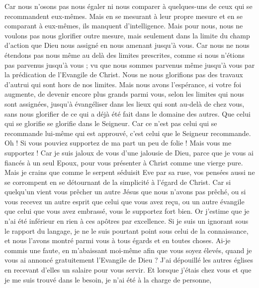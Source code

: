 \begin{multicols}{2}
Car nous n'osons pas nous égaler ni nous comparer à quelques-uns de ceux qui se recommandent eux-mêmes. Mais en se mesurant à leur propre mesure et en se comparant à eux-mêmes, ils manquent d’intelligence.
Mais pour nous, nous ne voulons pas nous glorifier outre mesure, mais seulement dans la limite du champ d’action que Dieu nous assigné en nous amenant jusqu’à vous.
Car nous ne nous étendons pas nous même au delà des limites prescrites, comme si nous n'étions pas parvenus jusqu'à vous ; vu que nous sommes parvenus même jusqu’à vous par la prédication de l'Evangile de Christ.
Nous ne nous glorifions pas des travaux d’autrui qui sont hors de nos limites. Mais nous avons l’espérance, si votre foi augmente, de devenir encore plus grands parmi vous, selon les limites qui nous sont assignées,
jusqu'à évangéliser dans les lieux qui sont au-delà de chez vous, sans nous glorifier de ce qui a déjà été fait dans le domaine des autres.
Que celui qui se glorifie se glorifie dans le Seigneur.
Car ce n'est pas celui qui se recommande lui-même qui est approuvé, c'est celui que le Seigneur recommande.
\VerseOne{}Oh ! Si vous pouviez supportez de ma part un peu de folie ! Mais vous me supportez !
Car je suis jaloux de vous d'une jalousie de Dieu, parce que je vous ai fiancés à un seul Epoux, pour vous présenter à Christ comme une vierge pure.
Mais je crains que comme le serpent séduisit Eve par sa ruse, vos pensées aussi ne se corrompent en se détournant de la simplicité à l’égard de Christ.
Car si quelqu'un vient vous prêcher un autre Jésus que nous n'avons pas prêché, ou si vous recevez un autre esprit que celui que vous avez reçu, ou un autre évangile que celui que vous avez embrassé, vous le supportez fort bien.
Or j'estime que je n'ai été inférieur en rien à ces apôtres par excellence.
Si je suis un ignorant sous le rapport du langage, je ne le suis pourtant point sous celui de la connaissance, et nous l’avons montré parmi vous à tous égards et en toutes choses.
Ai-je commis une faute, en m’abaissant moi-même afin que vous soyez élevés, quand je vous ai annoncé gratuitement l’Evangile de Dieu ?
J'ai dépouillé les autres églises en recevant d’elles un salaire pour vous servir. Et lorsque j’étais chez vous et que je me suis trouvé dans le besoin, je n’ai été à la charge de personne,

\end{multicols}
